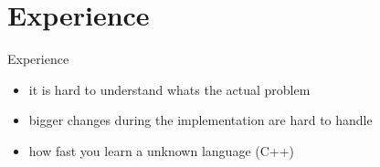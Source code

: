 \section{Experience}
\begin{frame}{Experience}
	\begin{itemize}
		\item it is hard to understand whats the actual problem
		\item bigger changes during the implementation are hard to handle
		\item how fast you learn a unknown language (C++)
	\end{itemize}
\end{frame}